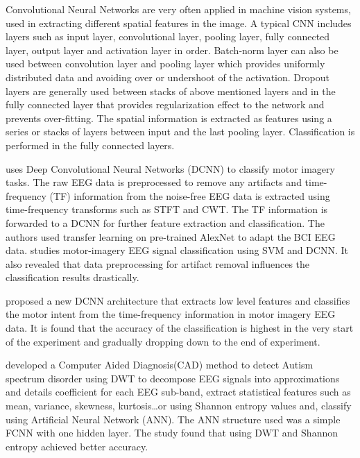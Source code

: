 Convolutional Neural Networks are very often applied in machine vision systems, used in extracting different spatial features in the image. A typical CNN includes layers such as input layer, convolutional layer, pooling layer, fully connected layer, output layer and activation layer in order. Batch-norm layer can also be used between convolution layer and pooling layer which provides uniformly distributed data and avoiding over or undershoot of the activation. Dropout layers are generally used between stacks of above mentioned layers and in the fully connected layer that provides regularization effect to the network and prevents over-fitting. The spatial information is extracted as features using a series or stacks of layers between input and the last pooling layer. Classification is performed in the fully connected layers. 

\cite{2019_MI_CNN_WT} uses Deep Convolutional Neural Networks (DCNN) to classify motor imagery tasks. The raw EEG data is preprocessed to remove any artifacts and time-frequency (TF)  information from the noise-free EEG data is extracted using time-frequency transforms such as STFT and CWT. The TF information is forwarded to a DCNN for further feature extraction and classification. The authors used transfer learning on pre-trained AlexNet to adapt the BCI EEG data. \cite{2018_BCI_SVM_DNN} studies motor-imagery EEG signal classification using SVM and DCNN. It also revealed that data preprocessing for artifact removal influences the classification results drastically.

\cite{2021_MI_DCNN} proposed a new DCNN architecture that extracts low level features and classifies the motor intent from the time-frequency information in motor imagery EEG data. It is found that the accuracy of the classification is highest in the very start of the experiment and gradually dropping down to the end of experiment.

\cite{2017_EEG_Wavelet_ANN} developed a Computer Aided Diagnosis(CAD) method to detect Autism spectrum disorder using DWT to decompose EEG signals into approximations and details coefficient for each EEG sub-band, extract statistical features such as mean, variance, skewness, kurtosis\dots or using Shannon entropy values and, classify using Artificial Neural Network (ANN). The ANN structure used was a simple FCNN with one hidden layer. The study found that using DWT and Shannon entropy achieved better accuracy. 


